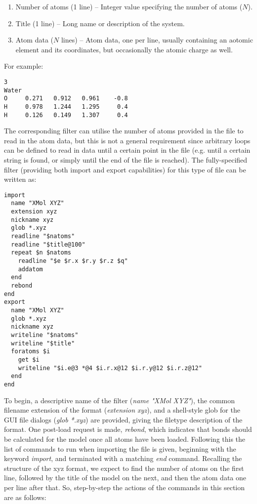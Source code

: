 \begin{enumerate}
  \item Number of atoms (1 line) -- Integer value specifying the number of atoms ($N$).
  \item Title (1 line) -- Long name or description of the system.
  \item Atom data ($N$ lines) -- Atom data, one per line, usually containing an aotomic element and its coordinates, but occasionally the atomic charge as well.
\end{enumerate}

For example:

\begin{verbatim}
3
Water
O     0.271   0.912   0.961    -0.8
H     0.978   1.244   1.295     0.4
H     0.126   0.149   1.307     0.4
\end{verbatim}

The corresponding filter can utilise the number of atoms provided in the file to read in the atom data, but this is not a general requirement since arbitrary loops can be defined to read in data until a certain point in the file (e.g. until a certain string is found, or simply until the end of the file is reached). The fully-specified filter (providing both import and export capabilities) for this type of file can be written as:

\begin{verbatim}
import
  name "XMol XYZ"
  extension xyz
  nickname xyz
  glob *.xyz
  readline "$natoms"
  readline "$title@100"
  repeat $n $natoms
    readline "$e $r.x $r.y $r.z $q"
    addatom
  end
  rebond
end
export
  name "XMol XYZ"
  glob *.xyz
  nickname xyz
  writeline "$natoms"
  writeline "$title"
  foratoms $i
    get $i
    writeline "$i.e@3 *@4 $i.r.x@12 $i.r.y@12 $i.r.z@12"
  end
end
\end{verbatim}

To begin, a descriptive name of the filter ({\it name "XMol XYZ"}), the common filename extension of the format ({\it extension xyz}), and a shell-style glob for the GUI file dialogs ({\it glob *.xyz}) are provided, giving the filetype description of the format. One post-load request is made, {\it rebond}, which indicates that bonds should be calculated for the model once all atoms have been loaded. Following this the list of commands to run when importing the file is given, beginning with the keyword {\it import}, and terminated with a matching {\it end} command. Recalling the structure of the xyz format, we expect to find the number of atoms on the first line, followed by the title of the model on the next, and then the atom data one per line after that. So, step-by-step the actions of the commands in this section are as follows:


